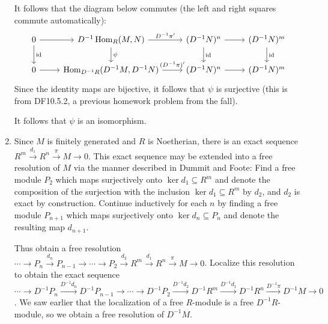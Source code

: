 \documentclass[11pt]{article}
\DeclareMathOperator{\id}{id}
\DeclareMathOperator{\Hom}{Hom}
\begin{document}
\begin{enumerate}[label=(\alph*)]
  It follows that the diagram below commutes (the left and right squares commute automatically): %
  \[\begin{tikzcd}
    0 & {D^{-1}\Hom_R(M,N)} & {(D^{-1}N)^n} & {(D^{-1}N)^m} \\
    0 & {\Hom_{D^{-1}R}(D^{-1}M,D^{-1}N)} & {(D^{-1}N)^n} & {(D^{-1}N)^m}
    \arrow["\id", from=1-1, to=2-1]
    \arrow["{D^{-1}\pi^\prime}", from=1-2, to=1-3]
    \arrow[from=1-3, to=1-4]
    \arrow[from=2-3, to=2-4]
    \arrow["\id", from=1-3, to=2-3]
    \arrow["\id", from=1-4, to=2-4]
    \arrow[from=1-1, to=1-2]
    \arrow[from=2-1, to=2-2]
    \arrow["{(D^{-1}\pi)^\prime}", from=2-2, to=2-3]
    \arrow["\psi", from=1-2, to=2-2]
  \end{tikzcd}\] Since the identity maps are bijective, it follows that $\psi$ is surjective (this is from DF10.5.2, a previous homework problem from the fall).

  It follows that $\psi$ is an isomorphism.

  \item Since $M$ is finitely generated and $R$ is Noetherian, there is an exact sequence $R^m\xrightarrow{d_1} R^n\xrightarrow{\pi} M\to 0$. This exact sequence may be extended into a free resolution of $M$ via the manner described in Dummit and Foote: Find a free module $P_2$ which maps surjectively onto $\ker d_1\subseteq R^m$ and denote the composition of the surjection with the inclusion $\ker d_1\subseteq R^m$ by $d_2$, and $d_2$ is exact by construction. Continue inductively for each $n$ by finding a free module $P_{n+1}$ which maps surjectively onto $\ker d_n\subseteq P_n$ and denote the resulting map $d_{n+1}$.
  
  Thus obtain a free resolution $\cdots\to P_n\xrightarrow{d_n}P_{n-1}\to\cdots\to P_2\xrightarrow{d_2}R^m\xrightarrow{d_1} R^n\xrightarrow{\pi} M\to 0$. Localize this resolution to obtain the exact sequence $\cdots\to D^{-1}P_n\xrightarrow{D^{-1}d_n}D^{-1}P_{n-1}\to\cdots\to D^{-1}P_2\xrightarrow{D^{-1}d_2}D^{-1}R^m\xrightarrow{D^{-1}d_1} D^{-1}R^n\xrightarrow{D^{-1}\pi} D^{-1}M\to 0$. We saw earlier that the localization of a free $R$-module is a free $D^{-1}R$-module, so we obtain a free resolution of $D^{-1}M$.
\end{enumerate}
\end{document}

